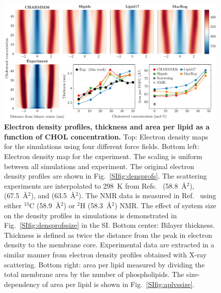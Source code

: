 \documentclass[aps,prl,superscriptaddress]{revtex4-2}
\begin{document}
\begin{figure}[htb!]
  \centering
  \includegraphics[width=\linewidth]{../FIGS/densitymaps.pdf}
  \caption{\label{fig:densmaps}%
  \textbf{Electron density profiles, thickness and area per lipid as a function of CHOL concentration.}
  Top: Electron density maps for the simulations using four different force fields.
  Bottom left: Electron density map for the experiment. The scaling is uniform between all simulations and experiment. The original electron density profiles are shown in Fig.~\ref{SIfig:densprofs}. The scattering experiments are interpolated to 298~K from Refs.~ (58.8~\AA{}$^2$),  (67.5~\AA{}$^2$), and  (63.5~\AA{}$^2$). The NMR data is measured in Ref.~ using either $^{13}$C (58.9~\AA{}$^2$) or $^2$H (58.3~\AA{}$^2$) NMR. The effect of system size on the density profiles in simulations is demonstrated in Fig.~\ref{SIfig:densprofssize} in the SI.
  Bottom center: Bilayer thickness. Thickness is defined as twice the distance from the peak in electron density to the membrane core. Experimental data are extracted in a similar manner from electron density profiles obtained with X-ray scattering.
  Bottom right: area per lipid measured by dividing the total membrane area by the number of phospholipids. 
  The size-dependency of area per lipid is shown in Fig.~\ref{SIfig:aplvssize}.
  }
\end{figure}
\end{document}
